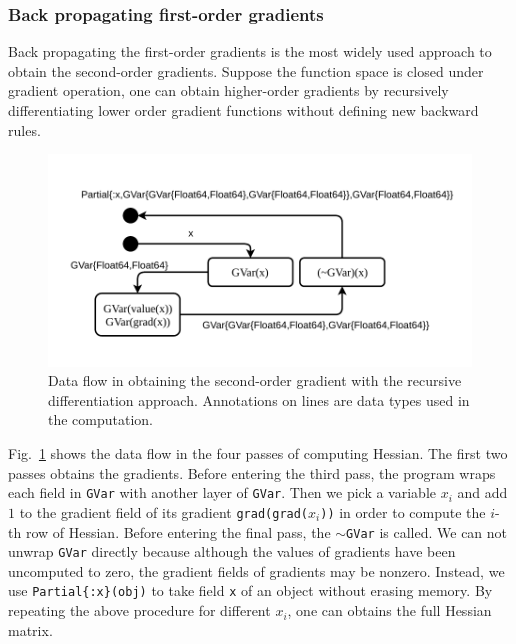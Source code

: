 \documentclass[aps,twocolumn,longbibliography,english,superscriptaddress]{revtex4-1}
\newcommand{\<}{\langle}
\renewcommand{\>}{\rangle}
\newcommand{\Fig}[1]{Fig.~\ref{#1}}
\theoremstyle{definition}\newtheorem{definition}{\textit{Definition}}
\begin{document}
\subsubsection{Back propagating first-order gradients}\label{sec:simplehessian}
Back propagating the first-order gradients is the most widely used approach to obtain the second-order gradients. Suppose the function space is closed under gradient operation, one can obtain higher-order gradients by recursively differentiating lower order gradient functions without defining new backward rules.
\begin{figure}[h]
    \centerline{\includegraphics[width=\columnwidth,trim={0 1cm 0cm 1cm},clip]{images/simplehessian.pdf}}
    \caption{Data flow in obtaining the second-order gradient with the recursive differentiation approach. Annotations on lines are data types used in the computation.}\label{fig:simplehessian}
\end{figure}

\Fig{fig:simplehessian} shows the data flow in the four passes of computing Hessian. The first two passes obtains the gradients. Before entering the third pass, the program wraps each field in \texttt{GVar} with another layer of \texttt{GVar}. Then we pick a variable $x_i$ and add $1$ to the gradient field of its gradient \texttt{grad(grad($x_i$))} in order to compute the $i$-th row of Hessian. Before entering the final pass, the \texttt{$\sim$GVar} is called. We can not unwrap \texttt{GVar} directly because although the values of gradients have been uncomputed to zero, the gradient fields of gradients may be nonzero. Instead, we use \texttt{Partial\{:x\}(obj)} to take field \texttt{x} of an object without erasing memory. By repeating the above procedure for different $x_i$, one can obtains the full Hessian matrix.
\end{document}
